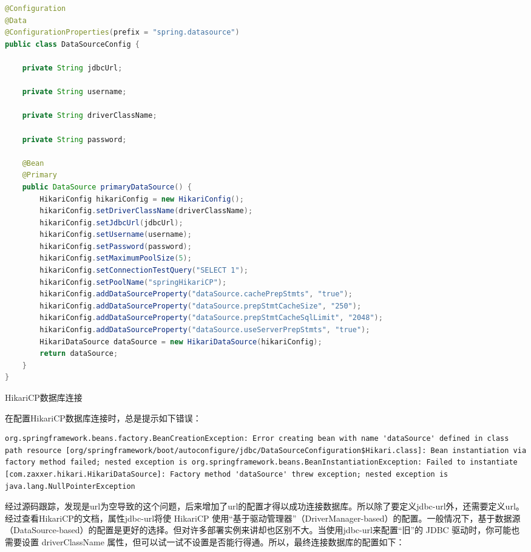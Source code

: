 \documentclass[12pt]{book}
\makeatletter
\numberwithin{dummy}{section}
\theoremstyle{ocrenumbox}
\theoremstyle{blacknumex}
\theoremstyle{blacknumbox}
\theoremstyle{ocrenum}
\renewcommand{\subsection}{\@startsection {subsection}{2}{\z@}
	{-3ex \@plus -0.1ex \@minus -.4ex}
	{0.5ex \@plus.2ex }
	{\normalfont\sffamily\bfseries}}
\makeatother
\begin{document}
\begin{lstlisting}[language=Java]
@Configuration
@Data
@ConfigurationProperties(prefix = "spring.datasource")
public class DataSourceConfig {

	private String jdbcUrl;
	
	private String username;
	
	private String driverClassName;
	
	private String password;
	
	@Bean
	@Primary
	public DataSource primaryDataSource() {
		HikariConfig hikariConfig = new HikariConfig();
		hikariConfig.setDriverClassName(driverClassName);
		hikariConfig.setJdbcUrl(jdbcUrl);
		hikariConfig.setUsername(username);
		hikariConfig.setPassword(password);
		hikariConfig.setMaximumPoolSize(5);
		hikariConfig.setConnectionTestQuery("SELECT 1");
		hikariConfig.setPoolName("springHikariCP");
		hikariConfig.addDataSourceProperty("dataSource.cachePrepStmts", "true");
		hikariConfig.addDataSourceProperty("dataSource.prepStmtCacheSize", "250");
		hikariConfig.addDataSourceProperty("dataSource.prepStmtCacheSqlLimit", "2048");
		hikariConfig.addDataSourceProperty("dataSource.useServerPrepStmts", "true");
		HikariDataSource dataSource = new HikariDataSource(hikariConfig);
		return dataSource;
	}
}
\end{lstlisting}

\subsection{HikariCP数据库连接}

在配置HikariCP数据库连接时，总是提示如下错误：

\begin{lstlisting}
org.springframework.beans.factory.BeanCreationException: Error creating bean with name 'dataSource' defined in class path resource [org/springframework/boot/autoconfigure/jdbc/DataSourceConfiguration$Hikari.class]: Bean instantiation via factory method failed; nested exception is org.springframework.beans.BeanInstantiationException: Failed to instantiate [com.zaxxer.hikari.HikariDataSource]: Factory method 'dataSource' threw exception; nested exception is java.lang.NullPointerException
\end{lstlisting}

经过源码跟踪，发现是url为空导致的这个问题，后来增加了url的配置才得以成功连接数据库。所以除了要定义jdbc-url外，还需要定义url。经过查看HikariCP的文档，属性jdbc-url将使 HikariCP 使用“基于驱动管理器”（DriverManager-based）的配置。一般情况下，基于数据源（DataSource-based）的配置是更好的选择。但对许多部署实例来讲却也区别不大。当使用jdbc-url来配置“旧”的 JDBC 驱动时，你可能也需要设置 driverClassName 属性，但可以试一试不设置是否能行得通。所以，最终连接数据库的配置如下：
\end{document}
